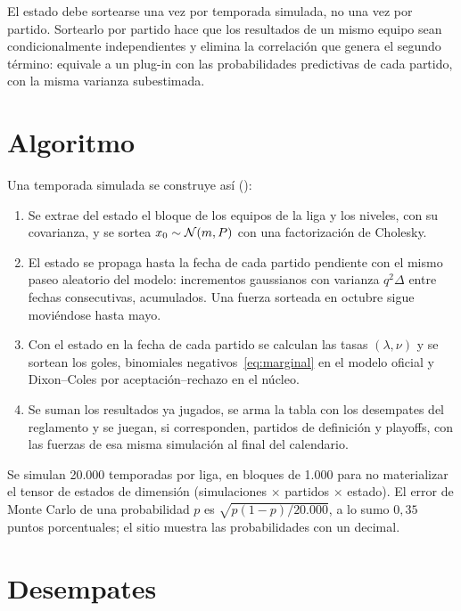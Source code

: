 \begin{observacion} \dem
El estado debe sortearse una vez por temporada simulada, no una vez por partido. Sortearlo por partido hace que los resultados de un mismo equipo sean condicionalmente independientes y elimina la correlación que genera el segundo término: equivale a un plug-in con las probabilidades predictivas de cada partido, con la misma varianza subestimada.
\end{observacion}

\section{Algoritmo}

Una temporada simulada se construye así ():

\begin{enumerate}
\item Se extrae del estado el bloque de los equipos de la liga y los niveles, con su covarianza, y se sortea $x_0\sim\mathcal{N}(m,P)$ con una factorización de Cholesky.
\item El estado se propaga hasta la fecha de cada partido pendiente con el mismo paseo aleatorio del modelo: incrementos gaussianos con varianza $q^2\Delta$ entre fechas consecutivas, acumulados. Una fuerza sorteada en octubre sigue moviéndose hasta mayo.
\item Con el estado en la fecha de cada partido se calculan las tasas $(\lambda,\nu)$ y se sortean los goles, binomiales negativos~\eqref{eq:marginal} en el modelo oficial y Dixon–Coles por aceptación–rechazo en el núcleo.
\item Se suman los resultados ya jugados, se arma la tabla con los desempates del reglamento y se juegan, si corresponden, partidos de definición y playoffs, con las fuerzas de esa misma simulación al final del calendario.
\end{enumerate}

Se simulan 20.000 temporadas por liga, en bloques de 1.000 para no materializar el tensor de estados de dimensión (simulaciones $\times$ partidos $\times$ estado). El error de Monte Carlo de una probabilidad $p$ es $\sqrt{p(1-p)/20.000}$, a lo sumo $0{,}35$ puntos porcentuales; el sitio muestra las probabilidades con un decimal.

\section{Desempates}

